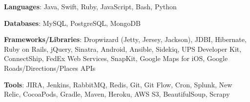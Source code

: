 \vspace{5mm}
	

\begin{cventries}
\vspace{-5mm}
  \cventry
    {}
    {}
    {}
    {}
    {
      \begin{cvitems}
        \item {\textbf{Languages}: Java, Swift, Ruby, JavaScript, Bash, Python}
        \vspace{1mm}
        \item {\textbf{Databases}: MySQL, PostgreSQL, MongoDB}
        \vspace{1mm}
        \item {\textbf{Frameworks/Libraries}: Dropwizard (Jetty, Jersey, Jackson), JDBI, Hibernate, Ruby on Rails, jQuery, Sinatra, Android, Ansible, Sidekiq, UPS Developer Kit, ConnectShip, FedEx Web Services, SnapKit, Google Maps for iOS, Google Roads/Directions/Places APIs}
        \vspace{1mm}
        \item {\textbf{Tools}: JIRA, Jenkins, RabbitMQ, Redis, Git, Git Flow, Cron, Splunk, New Relic, CocoaPods, Gradle, Maven, Heroku, AWS S3, BeautifulSoup, Scrapy}
      \end{cvitems}
    }
\end{cventries}
